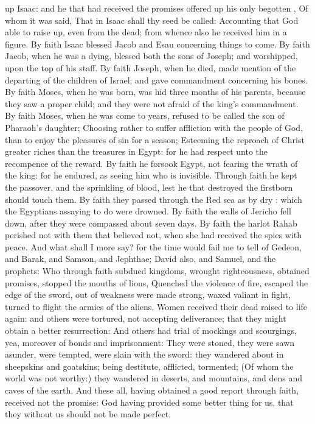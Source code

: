 {up
Isaac:
and he that had
received the
promises offered
up his only
begotten
{},
Of
whom it was
said,
That
in
Isaac
shall
thy
seed be
called:
Accounting
that
God
{}
able to
raise
{}
up,
even
from the
dead; from
whence
also he
received
him
in a
figure.
By
faith
Isaac
blessed
Jacob
and
Esau
concerning things to
come.
By
faith
Jacob, when he was a
dying,
blessed
both the
sons of
Joseph;
and
worshipped,
{}
upon the
top
of
his
staff.
By
faith
Joseph, when he
died, made
mention
of the
departing of the
children of
Israel;
and gave
commandment
concerning
his
bones.
By
faith
Moses, when he was
born, was
hid three
months
of
his
parents,
because they
saw
{}
a
proper
child;
and they
were
not
afraid
of the
king’s
commandment.
By
faith
Moses, when he was
come to
years,
refused to be
called the
son
of
Pharaoh’s
daughter;
Choosing
rather to suffer affliction
with the
people of
God,
than to
enjoy the
pleasures of
sin for a
season;
Esteeming the
reproach of
Christ
greater
riches than the
treasures
in
Egypt:
for he had
respect
unto the recompence of the
reward.
By
faith he
forsook
Egypt,
not
fearing the
wrath of the
king:
for he
endured,
as
seeing him who is
invisible.
Through
faith he
kept the
passover,
and the
sprinkling of
blood,
lest he that
destroyed the
firstborn should
touch
them.
By
faith they passed
through
the
Red
sea
as
by
dry
{}:
which the
Egyptians
assaying to
do were
drowned.
By
faith the
walls of
Jericho fell
down, after they were
compassed
about
seven
days.
By
faith the
harlot
Rahab
perished
not
with them that believed
not, when she had
received the
spies
with
peace.
And
what shall
I
more
say?
for the
time would
fail
me to
tell
of
Gedeon,
and
{}
Barak,
and
{}
Samson,
and
{}
Jephthae;
{}
David
also,
and
Samuel,
and
{} the
prophets:
Who
through
faith
subdued
kingdoms,
wrought
righteousness,
obtained
promises,
stopped the
mouths of
lions,
Quenched the
violence of
fire,
escaped the
edge of the
sword, out
of
weakness were made
strong,
waxed
valiant
in
fight, turned to
flight the
armies of the
aliens.
Women
received
their
dead raised to life
again:
and
others were
tortured,
not
accepting
deliverance;
that they might
obtain
a
better
resurrection:
And
others
had
trial
of
{}
mockings
and
scourgings,
yea,
moreover of
bonds
and
imprisonment:
They were
stoned, they were sawn
asunder, were
tempted, were
slain with the
sword: they wandered
about
in
sheepskins
and
goatskins; being
destitute,
afflicted,
tormented;
(Of
whom the
world
was
not
worthy:) they
wandered
in
deserts,
and
{}
mountains,
and
{}
dens
and
caves of the
earth.
And
these
all, having obtained a good
report
through
faith,
received
not the
promise:
God having
provided
some
better
thing
for
us,
that they
without
us
should
not be made
perfect.

}
